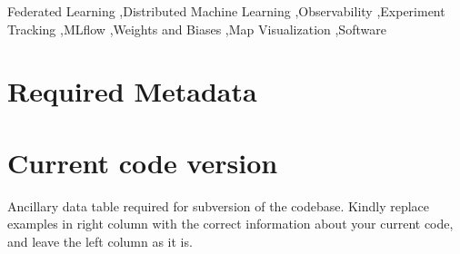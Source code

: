\documentclass[preprint,12pt, a4paper]{elsarticle}
\begin{document}
\begin{frontmatter}
\begin{keyword}
Federated Learning \sep Distributed Machine Learning \sep Observability \sep Experiment Tracking \sep MLflow \sep Weights and Biases \sep Map Visualization \sep Software



\end{keyword}

\end{frontmatter}


\section*{Required Metadata}
\label{}

\section*{Current code version}
\label{}

Ancillary data table required for subversion of the codebase. Kindly replace examples in right column with the correct information about your current code, and leave the left column as it is.
\end{document}
